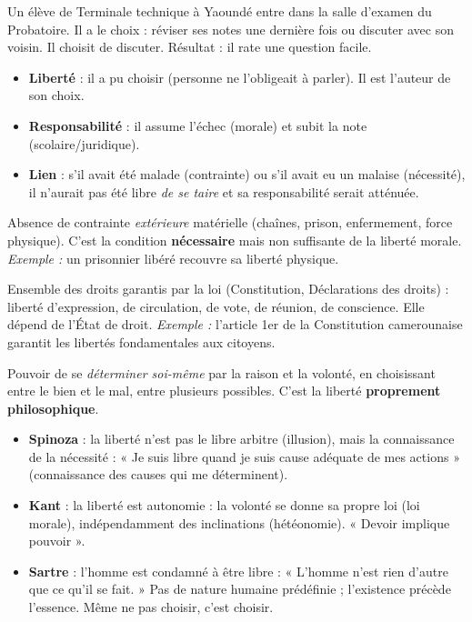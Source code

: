 \documentclass[11pt]{article}
\newcommand{\cle}[1]{{\popxbold\color{popdark}#1}}
\newcounter{popsec}
\newcounter{popsub}
\newcommand{\courssub}[1]{%
  \stepcounter{popsub}%
  \par\vspace{9pt}\noindent{\popxbold\fontsize{11.5}{13}\selectfont\color{popink}{\color{poporange}\thepopsec.\thepopsub}\hspace{6pt}#1}\par\nopagebreak\vspace{4pt}
}
\begin{document}
\begin{exemplebox}
Un élève de Terminale technique à Yaoundé entre dans la salle d'examen du Probatoire. Il a le choix : réviser ses notes une dernière fois ou discuter avec son voisin. Il choisit de discuter. Résultat : il rate une question facile.
\begin{itemize}
\item \textbf{Liberté} : il a pu choisir (personne ne l'obligeait à parler). Il est l'auteur de son choix.
\item \textbf{Responsabilité} : il assume l'échec (morale) et subit la note (scolaire/juridique).
\item \textbf{Lien} : s'il avait été malade (contrainte) ou s'il avait eu un malaise (nécessité), il n'aurait pas été libre \emph{de se taire} et sa responsabilité serait atténuée.
\end{itemize}
\end{exemplebox}

\courssub{Les formes de la liberté}

\begin{definition}
Absence de contrainte \emph{extérieure} matérielle (chaînes, prison, enfermement, force physique). C'est la condition \textbf{nécessaire} mais non suffisante de la liberté morale. \emph{Exemple :} un prisonnier libéré recouvre sa liberté physique.
\end{definition}

\begin{definition}
Ensemble des droits garantis par la loi (Constitution, Déclarations des droits) : liberté d'expression, de circulation, de vote, de réunion, de conscience. Elle dépend de l'État de droit. \emph{Exemple :} l'article 1er de la Constitution camerounaise garantit les libertés fondamentales aux citoyens.
\end{definition}

\begin{definition}
Pouvoir de se \emph{déterminer soi-même} par la raison et la volonté, en choisissant entre le bien et le mal, entre plusieurs possibles. C'est la liberté \textbf{proprement philosophique}.
\begin{itemize}
\item \textbf{Spinoza} : la liberté n'est pas le libre arbitre (illusion), mais la \cle{connaissance de la nécessité} : « Je suis libre quand je suis cause adéquate de mes actions » (connaissance des causes qui me déterminent).
\item \textbf{Kant} : la liberté est \cle{autonomie} : la volonté se donne sa propre loi (loi morale), indépendamment des inclinations (hétéonomie). « Devoir implique pouvoir ».
\item \textbf{Sartre} : l'homme est \cle{condamné à être libre} : « L'homme n'est rien d'autre que ce qu'il se fait. » Pas de nature humaine prédéfinie ; l'existence précède l'essence. Même ne pas choisir, c'est choisir.
\end{itemize}
\end{definition}
\end{document}
